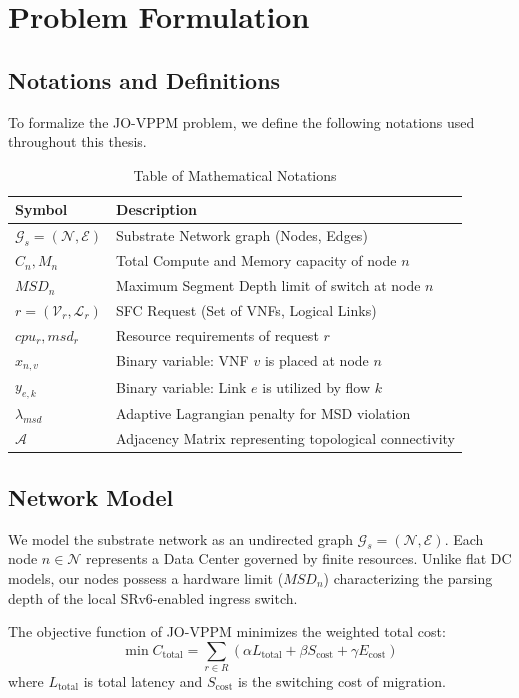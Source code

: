 \documentclass[12pt, a4paper, reqno, oneside]{book}
\begin{document}
\section{Problem Formulation}
\label{sec:problem_formulation}

\subsection{Notations and Definitions}
To formalize the JO-VPPM problem, we define the following notations used throughout this thesis.

\begin{longtable}{ll}
\caption{Table of Mathematical Notations} \label{table:notations} \\
\toprule
\textbf{Symbol} & \textbf{Description} \\
\midrule
$\mathcal{G}_s = (\mathcal{N}, \mathcal{E})$ & Substrate Network graph (Nodes, Edges) \\
$C_n, M_n$ & Total Compute and Memory capacity of node $n$ \\
$MSD_n$ & Maximum Segment Depth limit of switch at node $n$ \\
$r = (\mathcal{V}_r, \mathcal{L}_r)$ & SFC Request (Set of VNFs, Logical Links) \\
$cpu_r, msd_r$ & Resource requirements of request $r$ \\
$x_{n,v}$ & Binary variable: VNF $v$ is placed at node $n$ \\
$y_{e,k}$ & Binary variable: Link $e$ is utilized by flow $k$ \\
$\lambda_{msd}$ & Adaptive Lagrangian penalty for MSD violation \\
$\mathcal{A}$ & Adjacency Matrix representing topological connectivity \\
\bottomrule
\end{longtable}

\subsection{Network Model}
We model the substrate network as an undirected graph $\mathcal{G}_s = (\mathcal{N}, \mathcal{E})$. Each node $n \in \mathcal{N}$ represents a Data Center governed by finite resources. Unlike flat DC models, our nodes possess a hardware limit ($MSD_n$) characterizing the parsing depth of the local SRv6-enabled ingress switch.

The objective function of JO-VPPM minimizes the weighted total cost:
\begin{equation}
\min C_{\text{total}} = \sum_{r \in R} \left( \alpha L_{\text{total}} + \beta S_{\text{cost}} + \gamma E_{\text{cost}} \right)
\end{equation}
where $L_{\text{total}}$ is total latency and $S_{\text{cost}}$ is the switching cost of migration.
\end{document}

